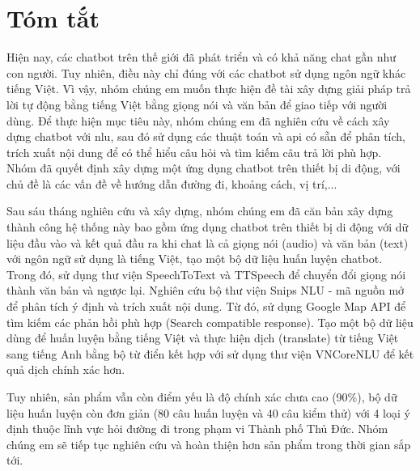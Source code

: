 \chapter*{Tóm tắt}
\label{tomtat}
Hiện nay, các chatbot trên thế giới đã phát triển và có khả năng chat gần như con người. Tuy nhiên, điều này chỉ đúng với các chatbot sử dụng ngôn ngữ khác tiếng Việt. Vì vậy, nhóm chúng em muốn thực hiện đề tài xây dựng giải pháp trả lời tự động bằng tiếng Việt bằng giọng nói và văn bản để giao tiếp với người dùng. Để thực hiện mục tiêu này, nhóm chúng em đã nghiên cứu về cách xây dựng chatbot với \ac{nlu}, sau đó sử dụng các thuật toán và \ac{api} có sẵn để phân tích, trích xuất nội dung để có thể hiểu câu hỏi và tìm kiếm câu trả lời phù hợp. Nhóm đã quyết định xây dựng một ứng dụng chatbot trên thiết bị di động, với chủ đề là các vấn đề về hướng dẫn đường đi, khoảng cách, vị trí,...

Sau sáu tháng nghiên cứu và xây dựng, nhóm chúng em đã căn bản xây dựng thành công hệ thống này bao gồm ứng dụng chatbot trên thiết bị di động với dữ liệu đầu vào và kết quả đầu ra khi chat là cả giọng nói (audio) và văn bản (text) với ngôn ngữ sử dụng là tiếng Việt, tạo một bộ dữ liệu huấn luyện chatbot. Trong đó, sử dụng thư viện SpeechToText\cite{stt} và TTSpeech\cite{tts} để chuyển đổi giọng nói thành văn bản và ngược lại. Nghiên cứu bộ thư viện Snips NLU\cite{Snipsnlu} - mã nguồn mở để phân tích ý định và trích xuất nội dung. Từ đó, sử dụng Google Map API\cite{ggmaps} để tìm kiếm các phản hồi phù hợp (Search compatible response). Tạo một bộ dữ liệu dùng để huấn luyện bằng tiếng Việt và thực hiện dịch (translate) từ tiếng Việt sang tiếng Anh bằng bộ từ điển kết hợp với sử dụng thư viện VNCoreNLU\cite{vncorenlu} để kết quả dịch chính xác hơn.

Tuy nhiên, sản phẩm vẫn còn điểm yếu là độ chính xác chưa cao (90\%), bộ dữ liệu huấn luyện còn đơn giản (80 câu huấn luyện và 40 câu kiểm thử) với 4 loại ý định thuộc lĩnh vực hỏi đường đi trong phạm vi Thành phố Thủ Đức. Nhóm chúng em sẽ tiếp tục nghiên cứu và hoàn thiện hơn sản phẩm trong thời gian sắp tới. 
